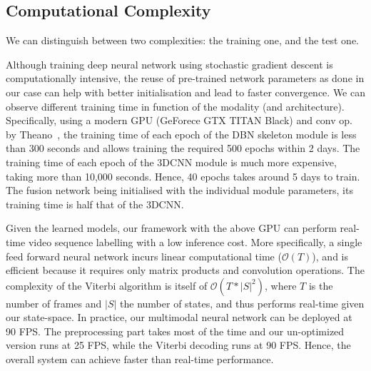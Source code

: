 \subsection{Computational Complexity}
\label{sec:ComputationalComplexity}

We can distinguish between two complexities: the training one, and the test one.

%
Although training deep neural network using stochastic gradient descent is computationally intensive,
the reuse of pre-trained network parameters as done in our case can help with  better initialisation and lead  to faster convergence.
%
We can observe different training time in function of the modality (and architecture).
%
Specifically, using a modern GPU (GeForece GTX TITAN Black) and conv op. by Theano~\cite{Bastien-Theano-2012},
the training time of each epoch of the DBN skeleton module is less than 300 seconds and allows training the required 500 epochs within 2 days.
%
The training time of each epoch of the 3DCNN \RGBD  module is much more  expensive,
taking more than 10,000 seconds.
Hence, 40 epochs takes around 5 days to train.
%
The fusion network being initialised with the individual module parameters, its training time is half that of the 3DCNN.


%
Given the learned models, our framework with the above GPU can perform real-time video sequence labelling with a low inference cost.
%
More specifically, a single feed forward neural network incurs linear computational time ($\mathcal{O}(T)$),
and is efficient because it requires only matrix products and convolution operations.
The complexity of the Viterbi algorithm is itself of $\mathcal{O} (T* |S|^2)$, where
$T$ is the number of frames and $|S|$ the number of states, and thus performs real-time given our state-space.
In practice, our multimodal neural network can be deployed at 90 FPS.
The preprocessing part takes most of the time and our un-optimized version runs at 25 FPS, while the
 Viterbi decoding  runs at 90 FPS. Hence, the overall system can achieve faster than real-time performance.


\endinput
